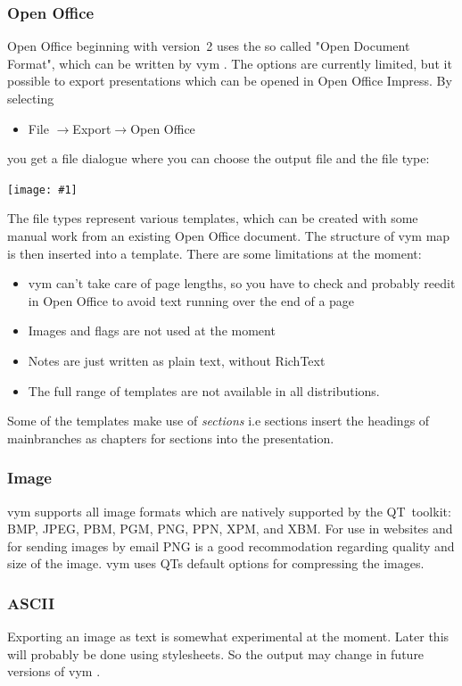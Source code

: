 \documentclass[12pt,a4paper]{article}
\newcommand{\maximage}[1]{  
    \begin{center}
        \texttt{[image: \#1]} 
    \end{center}
}
\newcommand{\vym}{{\sc vym }}
\newcommand{\ra}{$\longrightarrow$}
\begin{document}
\subsubsection*{Open Office}
Open Office beginning with version~2 uses the so called "Open Document Format", which can be written by \vym. The options are
currently limited, but it possible to export presentations which can be
opened in Open Office Impress. By selecting
\begin{itemize}
    \item File  \ra Export\ra Open Office
\end{itemize}
you get a file dialogue where you can choose the output file and the
file type:
    \maximage{images/export-oo.png}
The file types represent various templates, which can be created with
some manual work from an existing Open Office document. The structure of
\vym map is then inserted into a template. 
There are some limitations at the moment:
\begin{itemize}
    \item \vym can't take care of page lengths, so you have to check and
    probably reedit in Open Office to avoid text running over the end of
    a page
    \item Images and flags are not used at the moment
    \item Notes are just written as plain text, without RichText 
    \item The full range of templates are not available in all distributions.   
\end{itemize}
Some of the templates make use of {\em sections} i.e sections insert the
headings of mainbranches as chapters for sections into the presentation.

\subsubsection*{Image}
\vym supports all image formats which are natively supported by the
QT~toolkit:
BMP, JPEG, PBM, PGM, PNG, PPN, XPM, and XBM.
For use in websites and for sending images by email PNG is a good
recommodation regarding quality and size of the image. \vym uses QTs
default options for compressing the images.

\subsubsection*{ASCII}
Exporting an image as text is somewhat experimental at the moment. Later
this will probably be done using stylesheets. So the output may change in
future versions of \vym.
\end{document}
